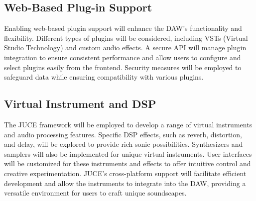 \documentclass[10pt,twocolumn]{article}
\begin{document}
\subsection{Web-Based Plug-in Support}
Enabling web-based plugin support will enhance the DAW's functionality and flexibility. Different types of plugins will be considered, including VSTs (Virtual Studio Technology) and custom audio effects. A secure API will manage plugin integration to ensure consistent performance and allow users to configure and select plugins easily from the frontend. Security measures will be employed to safeguard data while ensuring compatibility with various plugins.
\subsection{Virtual Instrument and DSP}
The JUCE framework will be employed to develop a range of virtual instruments and audio processing features. Specific DSP effects, such as reverb, distortion, and delay, will be explored to provide rich sonic possibilities. Synthesizers and samplers will also be implemented for unique virtual instruments. User interfaces will be customized for these instruments and effects to offer intuitive control and creative experimentation. JUCE's cross-platform support will facilitate efficient development and allow the instruments to integrate into the DAW, providing a versatile environment for users to craft unique soundscapes.
\end{document}
